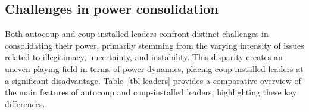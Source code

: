 \documentclass[
  12pt,
]{report}
\newcommand{\blandscape}{\begin{landscape}}
\newcommand{\elandscape}{\end{landscape}}
\begin{document}
\subsection{Challenges in power
consolidation}\label{challenges-in-power-consolidation}

Both autocoup and coup-installed leaders confront distinct challenges in
consolidating their power, primarily stemming from the varying intensity
of issues related to illegitimacy, uncertainty, and instability. This
disparity creates an uneven playing field in terms of power dynamics,
placing coup-installed leaders at a significant disadvantage.
Table~\ref{tbl-leaders} provides a comparative overview of the main
features of autocoup and coup-installed leaders, highlighting these key
differences.

\blandscape

\begin{table}

\caption{\label{tbl-leaders}Main features of autocoup and coup-installed
leaders}


\end{table}%

\elandscape
\end{document}
